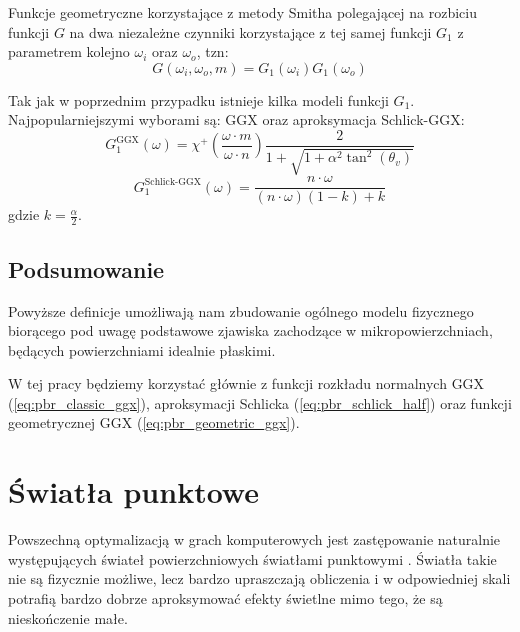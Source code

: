 \documentclass[../main.tex]{subfiles}
\begin{document}
Funkcje geometryczne korzystające z metody Smitha polegającej na rozbiciu
funkcji $G$ na dwa niezależne czynniki korzystające z tej samej funkcji $G_1$
z parametrem kolejno $\omega_i$ oraz $\omega_o$, tzn:
\begin{equation}
  G(\omega_i, \omega_o, m) = G_1(\omega_i) G_1(\omega_o)
\end{equation}

Tak jak w poprzednim przypadku istnieje kilka modeli funkcji $G_1$.
Najpopularniejszymi wyborami są: GGX \cite{WalterMicrofacetModels} oraz aproksymacja Schlick-GGX:
\begin{equation}
  G_{1}^{\text{GGX}}(\omega) =
    \chi^{+}\left(\frac{\omega \cdot m}{\omega \cdot n}\right)
    \frac{2}{
      1 + \sqrt{
        1 + \alpha^2 \tan^{2}\left(\theta_v\right)
      }
    }
\label{eq:pbr_geometric_ggx}
\end{equation}
\begin{equation}
  G_{1}^{\text{Schlick-GGX}}(\omega) =
    \frac{n \cdot \omega}{
      (n \cdot \omega)(1 - k) + k
    }
\end{equation}
\noindent gdzie $k = \frac{\alpha}{2}$.

\subsection{Podsumowanie}

Powyższe definicje umożliwają nam zbudowanie ogólnego modelu fizycznego
biorącego pod uwagę podstawowe zjawiska zachodzące w mikropowierzchniach,
będących powierzchniami idealnie płaskimi.

W tej pracy będziemy korzystać głównie z funkcji rozkładu normalnych GGX (\ref{eq:pbr_classic_ggx}), aproksymacji Schlicka (\ref{eq:pbr_schlick_half}) oraz funkcji geometrycznej GGX (\ref{eq:pbr_geometric_ggx}).


\section{Światła punktowe}

Powszechną optymalizacją w grach komputerowych jest zastępowanie naturalnie występujących świateł powierzchniowych światłami punktowymi \cite{pbr_background}. Światła takie nie są fizycznie możliwe, lecz bardzo upraszczają obliczenia i w odpowiedniej skali potrafią bardzo dobrze aproksymować efekty świetlne mimo tego, że są nieskończenie małe.
\end{document}
